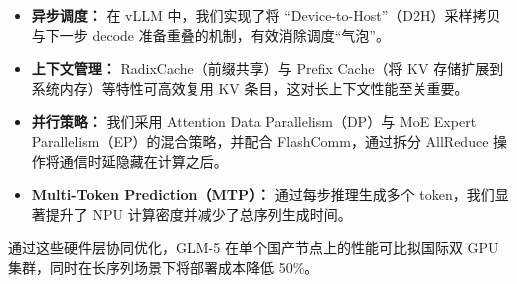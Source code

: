 \begin{itemize}[leftmargin=1.5em,itemsep=2pt]
    \item \textbf{异步调度：} 在 vLLM 中，我们实现了将 ``Device-to-Host''（D2H）采样拷贝与下一步 decode 准备重叠的机制，有效消除调度“气泡”。
    
    \item \textbf{上下文管理：} RadixCache（前缀共享）与 Prefix Cache（将 KV 存储扩展到系统内存）等特性可高效复用 KV 条目，这对长上下文性能至关重要。

    \item \textbf{并行策略：} 我们采用 Attention Data Parallelism（DP）与 MoE Expert Parallelism（EP）的混合策略，并配合 FlashComm，通过拆分 AllReduce 操作将通信时延隐藏在计算之后。

    \item \textbf{Multi-Token Prediction（MTP）：} 通过每步推理生成多个 token，我们显著提升了 NPU 计算密度并减少了总序列生成时间。
\end{itemize}

通过这些硬件层协同优化，GLM-5 在单个国产节点上的性能可比拟国际双 GPU 集群，同时在长序列场景下将部署成本降低 50\%。
